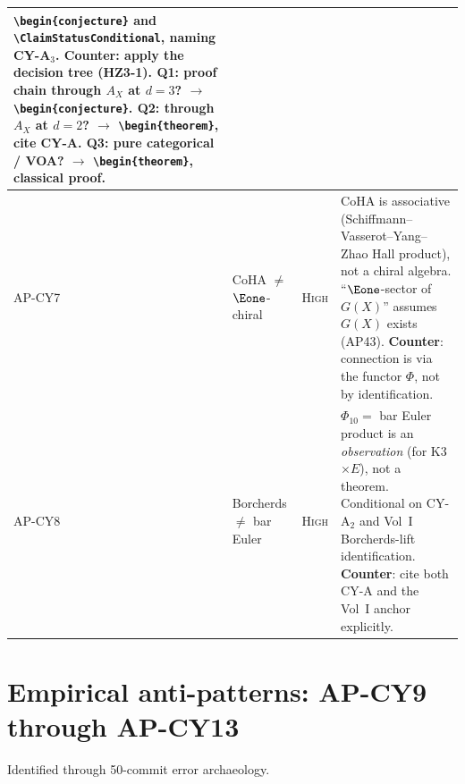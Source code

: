 {\begin{longtable}{@{}p{1.6cm}p{2.4cm}lp{7.4cm}@{}}
  \verb|\begin{conjecture}| and \verb|\ClaimStatusConditional|,
  naming CY-A$_3$.
  \textbf{Counter}: apply the decision tree (HZ3-1).
  Q1: proof chain through $A_X$ at $d=3$?
  $\to$ \verb|\begin{conjecture}|.
  Q2: through $A_X$ at $d=2$?
  $\to$ \verb|\begin{theorem}|, cite CY-A.
  Q3: pure categorical / VOA?
  $\to$ \verb|\begin{theorem}|, classical proof. \\
\midrule
AP-CY7 & CoHA $\neq$ $\Eone$-chiral & \textsc{High} &
  CoHA is associative (Schiffmann--Vasserot--Yang--Zhao
  Hall product), not a chiral algebra.
  ``$\Eone$-sector of $G(X)$'' assumes $G(X)$ exists (AP43).
  \textbf{Counter}: connection is via the functor $\Phi$,
  not by identification. \\
\midrule
AP-CY8 & Borcherds $\neq$ bar Euler & \textsc{High} &
  $\Phi_{10} =$ bar Euler product is an \emph{observation}
  (for K3$\times E$), not a theorem.
  Conditional on CY-A$_2$ and Vol~I Borcherds-lift
  identification.
  \textbf{Counter}: cite both CY-A and the Vol~I anchor
  explicitly. \\
\bottomrule
\end{longtable}
}%

\section{Empirical anti-patterns: AP-CY9 through AP-CY13}
\label{sec:ap-cy9-13-full}

Identified through 50-commit error archaeology.

